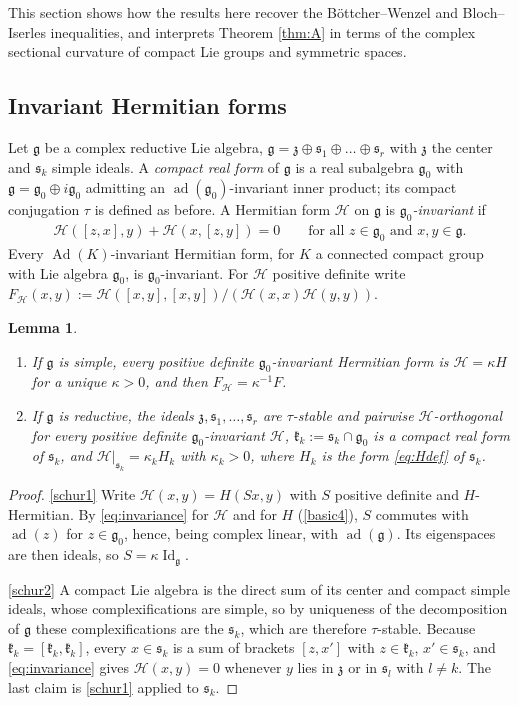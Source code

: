 \documentclass [leqno, 10pt]{amsart}
\newtheorem{lemma}[theorem]{Lemma}%
\theoremstyle{definition}
\numberwithin{equation}{section}
\newcommand{\kl}{\mathfrak{k}}
\newcommand{\id}{\operatorname{Id}}
\newcommand{\g}{\mathfrak{g}}
\newcommand{\ad}{\operatorname{ad}}
\newcommand{\Ad}{\operatorname{Ad}}
\newcommand{\gz}{\g_{0}}
\newcommand{\HH}{\mathcal H}
\newcommand{\subs}{\mathfrak{s}}
\begin{document}
This section shows how the results here recover the Böttcher--Wenzel and Bloch--Iserles inequalities, and interprets Theorem \ref{thm:A} in terms of the complex sectional curvature of compact Lie groups and symmetric spaces.

\subsection{Invariant Hermitian forms}
Let $\g$ be a complex reductive Lie algebra, $\g = \mathfrak{z}\oplus\subs_{1}\oplus\dots\oplus\subs_{r}$ with $\mathfrak{z}$ the center and $\subs_{k}$ simple ideals. A \emph{compact real form} of $\g$ is a real subalgebra $\gz$ with $\g = \gz \oplus i\gz$ admitting an $\ad(\gz)$-invariant inner product; its compact conjugation $\tau$ is defined as before. A Hermitian form $\HH$ on $\g$ is \emph{$\gz$-invariant} if
\begin{align}\label{eq:invariance}
\HH([z, x], y) + \HH(x, [z, y]) = 0 \qquad \text{for all } z \in \gz \text{ and } x, y \in \g.
\end{align}
Every $\Ad(K)$-invariant Hermitian form, for $K$ a connected compact group with Lie algebra $\gz$, is $\gz$-invariant. For $\HH$ positive definite write $F_{\HH}(x, y) := \HH([x, y], [x, y])/(\HH(x, x)\HH(y, y))$.

\begin{lemma}\label{lem:schur}
\leavevmode\noindent
\begin{enumerate}[label=(\arabic*), ref=(\arabic*)]
\item\label{schur1} If $\g$ is simple, every positive definite $\gz$-invariant Hermitian form is $\HH = \kappa H$ for a unique $\kappa > 0$, and then $F_{\HH} = \kappa^{-1}F$.
\item\label{schur2} If $\g$ is reductive, the ideals $\mathfrak{z}, \subs_{1}, \dots, \subs_{r}$ are $\tau$-stable and pairwise $\HH$-orthogonal for every positive definite $\gz$-invariant $\HH$, $\kl_{k} := \subs_{k} \cap \gz$ is a compact real form of $\subs_{k}$, and $\HH|_{\subs_{k}} = \kappa_{k}H_{k}$ with $\kappa_{k} > 0$, where $H_{k}$ is the form \eqref{eq:Hdef} of $\subs_{k}$.
\end{enumerate}
\end{lemma}
\begin{proof}
\ref{schur1} Write $\HH(x, y) = H(Sx, y)$ with $S$ positive definite and $H$-Hermitian. By \eqref{eq:invariance} for $\HH$ and for $H$ (\eqref{basic4}), $S$ commutes with $\ad(z)$ for $z \in \gz$, hence, being complex linear, with $\ad(\g)$. Its eigenspaces are then ideals, so $S = \kappa\id_{\g}$.

\ref{schur2} A compact Lie algebra is the direct sum of its center and compact simple ideals, whose complexifications are simple, so by uniqueness of the decomposition of $\g$ these complexifications are the $\subs_{k}$, which are therefore $\tau$-stable. Because $\kl_{k} = [\kl_{k}, \kl_{k}]$, every $x \in \subs_{k}$ is a sum of brackets $[z, x']$ with $z \in \kl_{k}$, $x' \in \subs_{k}$, and \eqref{eq:invariance} gives $\HH(x, y) = 0$ whenever $y$ lies in $\mathfrak{z}$ or in $\subs_{l}$ with $l \neq k$. The last claim is \ref{schur1} applied to $\subs_{k}$.
\end{proof}
\end{document}
